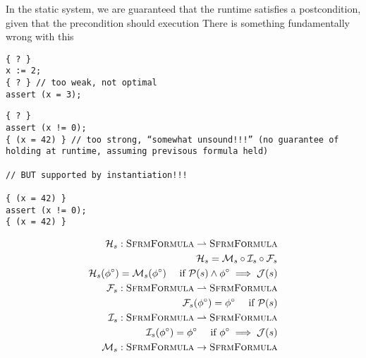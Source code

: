 In the static system, we are guaranteed that the runtime satisfies a postcondition, given that the precondition should execution
There is something fundamentally wrong with this 




\begin{verbatim}
{ ? }
x := 2;
{ ? } // too weak, not optimal
assert (x = 3);
\end{verbatim}
\begin{verbatim}
{ ? }
assert (x != 0);
{ (x = 42) } // too strong, “somewhat unsound!!!” (no guarantee of holding at runtime, assuming previsous formula held)

// BUT supported by instantiation!!!

{ (x = 42) }
assert (x != 0);
{ (x = 42) }
\end{verbatim}

\begin{align*}
\mathcal{H}_s : \textsc{SfrmFormula} \rightharpoonup \textsc{SfrmFormula}\\
\mathcal{H}_s = \mathcal{M}_s \circ \mathcal{I}_s \circ \mathcal{F}_s\\
\mathcal{H}_s({\phi}^{\circ}) = \mathcal{M}_s({\phi}^{\circ}) \quad\text{ if $\mathcal{P}(s) \wedge {\phi}^{\circ} \implies \mathcal{J}(s)$} \\
\mathcal{F}_s : \textsc{SfrmFormula} \rightharpoonup \textsc{SfrmFormula}\\
\mathcal{F}_s({\phi}^{\circ}) = {\phi}^{\circ} \quad\text{ if $\mathcal{P}(s)$} \\
\mathcal{I}_s : \textsc{SfrmFormula} \rightharpoonup \textsc{SfrmFormula}\\
\mathcal{I}_s({\phi}^{\circ}) = {\phi}^{\circ} \quad\text{ if ${\phi}^{\circ} \implies \mathcal{J}(s)$} \\
\mathcal{M}_s : \textsc{SfrmFormula} \rightarrow \textsc{SfrmFormula}\\
\end{align*}


